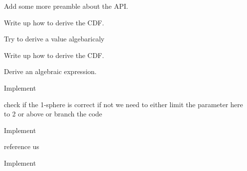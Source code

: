 
\begin{DoxyRefList}
\item[\label{todo__todo000016}%
\hypertarget{todo__todo000016}{}%
Group \hyperlink{group__api}{api} ]Add some more preamble about the A\-P\-I.


\item[\label{todo__todo000001}%
\hypertarget{todo__todo000001}{}%
Global \hyperlink{_cube_8h_aa32dd25cda8601c7f6af2dbd096dc58c}{Cube\-Distance\-C\-D\-F} (double a, double $\ast$b)]Write up how to derive the C\-D\-F.  
\item[\label{todo__todo000002}%
\hypertarget{todo__todo000002}{}%
Global \hyperlink{_cube_8h_ac37d5ff3c99d8637fc414212ac041f18}{Cube\-Distance\-Var} (double $\ast$parameters)]Try to derive a value algebaricaly  
\item[\label{todo__todo000003}%
\hypertarget{todo__todo000003}{}%
Global \hyperlink{_disk_8h_a8958adae00c0c55d68c1e81deb51c06b}{Disk\-Distance\-C\-D\-F} (double a, double $\ast$b)]Write up how to derive the C\-D\-F.  
\item[\label{todo__todo000004}%
\hypertarget{todo__todo000004}{}%
Global \hyperlink{_disk_8h_a156ab336770f189207572a9282158392}{Disk\-Distance\-Var} (double $\ast$parameters)]Derive an algebraic expression.  
\item[\label{todo__todo000007}%
\hypertarget{todo__todo000007}{}%
Global \hyperlink{_hyper_sphere_8h_ae5411ac6ba2485c1e033760ac2245e74}{Hyper\-Sphere\-Distance\-C\-D\-F} (double t, double $\ast$parameters)]Implement  
\item[\label{todo__todo000010}%
\hypertarget{todo__todo000010}{}%
Global \hyperlink{_hyper_sphere_8h_a1fd054315809f3be16b79fc198a2a9b8}{Hyper\-Sphere\-Distance\-Check\-Parameters} (double $\ast$parameters, int $\ast$result, char $\ast$error\-\_\-str)]check if the 1-\/sphere is correct if not we need to either limit the parameter here to 2 or above or branch the code  
\item[\label{todo__todo000008}%
\hypertarget{todo__todo000008}{}%
Global \hyperlink{_hyper_sphere_8h_a650d9f6bdb5043a287c9ed5e67419941}{Hyper\-Sphere\-Distance\-Mean} (double $\ast$parameters)]Implement  
\item[\label{todo__todo000005}%
\hypertarget{todo__todo000005}{}%
Global \hyperlink{_hyper_sphere_8h_ac9f09ad018eaa239847e438a60d75aa3}{Hyper\-Sphere\-Distance\-P\-D\-F} (double t, double $\ast$parameters)]reference us  
\item[\label{todo__todo000009}%
\hypertarget{todo__todo000009}{}%
Global \hyperlink{_hyper_sphere_8h_a967f1346407b9b3263549e1052407fa4}{Hyper\-Sphere\-Distance\-Var} (double $\ast$parameters)]Implement  

\end{DoxyRefList}
